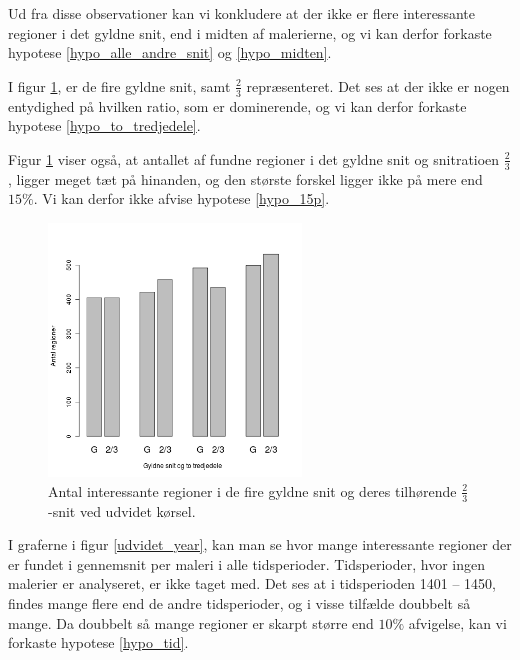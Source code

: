 {Ud fra disse observationer kan vi konkludere at der ikke er flere
interessante regioner i det gyldne snit, end i midten af malerierne, og
vi kan derfor forkaste hypotese \ref{hypo_alle_andre_snit} og
\ref{hypo_midten}.

I figur \ref{G_vs_to_trejedele_udvidet}, er de fire gyldne snit, samt
$\frac{2}{3}$ repræsenteret. Det ses at der ikke er nogen entydighed på
hvilken ratio, som er dominerende, og vi kan derfor forkaste hypotese
\ref{hypo_to_tredjedele}.

Figur \ref{G_vs_to_trejedele_udvidet} viser også, at antallet af fundne
regioner i det gyldne snit og snitratioen $\frac{2}{3}$, ligger meget
tæt på hinanden, og den største forskel ligger ikke på mere end $15\%$.
Vi kan derfor ikke afvise hypotese \ref{hypo_15p}.

\begin{figure}[h!]
	\begin{center}
		\includegraphics[width=0.6\textwidth]{afsnit/resultater/billeder/G_vs_to_tredjedeleU.png}
	\end{center}
    \caption{Antal interessante regioner i de fire gyldne snit og deres
    tilhørende $\frac{2}{3}$-snit ved udvidet kørsel.}
	\label{G_vs_to_trejedele_udvidet}
\end{figure}

I graferne i figur \ref{udvidet_year}, kan man se hvor mange
interessante regioner der er fundet i gennemsnit per maleri i alle
tidsperioder.  Tidsperioder, hvor ingen malerier er analyseret, er ikke
taget med. Det ses at i tidsperioden 1401 -- 1450, findes mange flere
end de andre tidsperioder, og i visse tilfælde doubbelt så mange. Da
doubbelt så mange regioner er skarpt større end $10\%$ afvigelse, kan vi
forkaste hypotese \ref{hypo_tid}.

}
